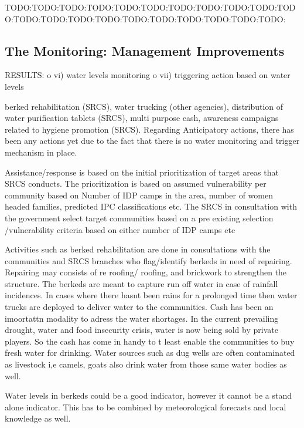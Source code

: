 TODO:TODO:TODO:TODO:TODO:TODO:TODO:TODO:TODO:TODO:TODO:TODO:TODO:TODO:TODO:TODO:TODO:TODO:TODO:TODO:TODO:
\subsection{The Monitoring: Management Improvements}
RESULTS:
o	vi) water levels monitoring
o	vii) triggering action based on water levels


berked rehabilitation (SRCS), water trucking (other agencies), distribution of water purification tablets (SRCS), multi purpose cash, awareness campaigns related to hygiene promotion (SRCS). Regarding Anticipatory actions, there has been any actions yet due to the fact that there is no water monitoring and trigger mechanism in place.

Assistance/response is based on the initial prioritization of target areas that SRCS conducts. The prioritization is based on assumed vulnerability per community based on Number of IDP camps in the area, number of women headed families, predicted IPC classifications etc.
The SRCS in consultation with the government select target communities based on a pre existing selection /vulnerability criteria based on either number of IDP camps etc


Activities such as berked rehabilitation are done in consultations with the communities and SRCS branches who flag/identify berkeds in need of repairing. Repairing may consists of re roofing/ roofing, and brickwork to strengthen the structure. The berkeds are meant to capture run off water in case of rainfall incidences. In cases where there hasnt been rains for a prolonged time then water trucks are deployed to deliver water to the communities. Cash has been an imoortattn modality to adress the water shortages. In the current prevailing drought, water and food insecurity crisis, water is now being sold by private players. So the cash has come in handy to t least enable the communities to buy fresh water for drinking. Water sources such as dug wells are often contaminated as livestock i,e camels, goats also drink water from those same water bodies as well.

Water levels in berkeds could be a good indicator, however it cannot be a stand alone indicator. This has to be combined by meteorological forecasts and local knowledge as well.

